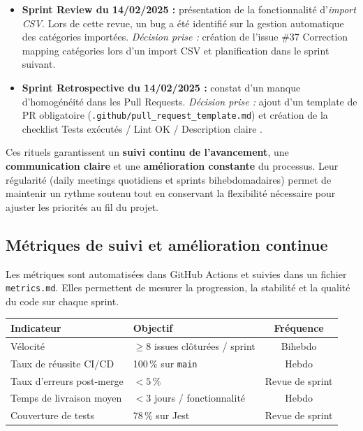 \begin{itemize}
    \item \textbf{Sprint Review du 14/02/2025 :} présentation de la fonctionnalité d’\textit{import CSV}.  
    Lors de cette revue, un bug a été identifié sur la gestion automatique des catégories importées.  
    \textit{Décision prise :} création de l’issue \#37 \og Correction mapping catégories lors d’un import CSV \fg{} et planification dans le sprint suivant.
    \item \textbf{Sprint Retrospective du 14/02/2025 :} constat d’un manque d’homogénéité dans les Pull Requests.  
    \textit{Décision prise :} ajout d’un template de PR obligatoire (\texttt{.github/pull\_request\_template.md}) et création de la checklist \og Tests exécutés / Lint OK / Description claire \fg{}.
\end{itemize}

Ces rituels garantissent un \textbf{suivi continu de l’avancement}, une \textbf{communication claire} et une \textbf{amélioration constante} du processus.  
Leur régularité (daily meetings quotidiens et sprints bihebdomadaires) permet de maintenir un rythme soutenu tout en conservant la flexibilité nécessaire pour ajuster les priorités au fil du projet.

\subsection{Métriques de suivi et amélioration continue}

Les métriques sont automatisées dans GitHub Actions et suivies dans un fichier \texttt{metrics.md}.  
Elles permettent de mesurer la progression, la stabilité et la qualité du code sur chaque sprint.

\begin{center}
\begin{tabular}{|l|p{6cm}|c|}
\hline
\textbf{Indicateur} & \textbf{Objectif} & \textbf{Fréquence} \\
\hline
Vélocité & $\geq 8$ issues clôturées / sprint & Bihebdo \\
Taux de réussite CI/CD & 100\,\% sur \texttt{main} & Hebdo \\
Taux d’erreurs post-merge & $< 5\,\%$ & Revue de sprint \\
Temps de livraison moyen & $< 3$ jours / fonctionnalité & Hebdo \\
Couverture de tests & 78\,\% sur Jest & Revue de sprint \\
\hline
\end{tabular}
\end{center}

